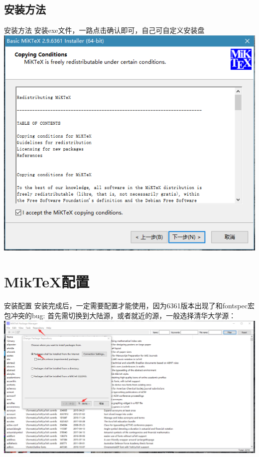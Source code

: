 \documentclass[sectioncirclenumberstyle]{le2iutbmbeamer}
\begin{document}
\subsection{安装方法}

\begin{frame}{安装方法}
安装exe文件，一路点击确认即可，自己可自定义安装盘
\centering
\includegraphics[height=0.6\linewidth]{figures/1}
\end{frame}

\section{Mik\TeX{}配置}
\begin{frame}{安装配置}
安装完成后，\alert{一定需要配置才能使用，因为6361版本出现了和fontspec宏包冲突的bug}:
首先需切换到大陆源，或者就近的源，一般选择清华大学源：
\centering
\includegraphics[height=0.6\linewidth]{figures/3}
\end{frame}
\end{document}
